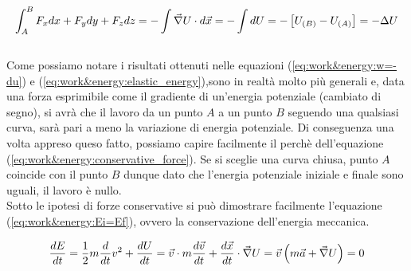 \begin{equation}
    \int_A^B F_xdx+F_ydy+F_zdz = -\int\vec \nabla U\cdot d\vec x = -\int dU 
    = -\left[ U_{(B)}-U_{(A)}\right] = -\Delta U
\end{equation}
\\
Come possiamo notare i risultati ottenuti nelle equazioni (\ref{eq:work&energy:w=-du})
e (\ref{eq:work&energy:elastic_energy}),sono in realtà molto più generali e,
data una forza esprimibile come il gradiente di un'energia potenziale
(cambiato di segno), si avrà che il lavoro da un punto $A$ a un punto $B$
seguendo una qualsiasi curva, sarà pari a meno la variazione di energia
potenziale. Di conseguenza una volta appreso queso fatto, possiamo capire
facilmente il perchè dell'equazione (\ref{eq:work&energy:conservative_force}).
Se si sceglie una curva chiusa, punto $A$ coincide con il punto $B$ dunque
dato che l'energia potenziale iniziale e finale sono uguali, il lavoro è
nullo.\\
Sotto le ipotesi di forze conservative si può dimostrare facilmente l'equazione
(\ref{eq:work&energy:Ei=Ef}), ovvero la conservazione dell'energia meccanica.

\begin{equation}
    \frac{dE}{dt} = \frac12m\frac{d}{dt}v^2+\frac{dU}{dt} =
    \vec v\cdot m\frac{d\vec v}{dt} + \frac{d\vec x}{dt}\cdot\vec\nabla U =
    \vec v\left( m\vec a + \vec\nabla U\right) = 0
\label{eq:work&energy:energy_conservation}
\end{equation}